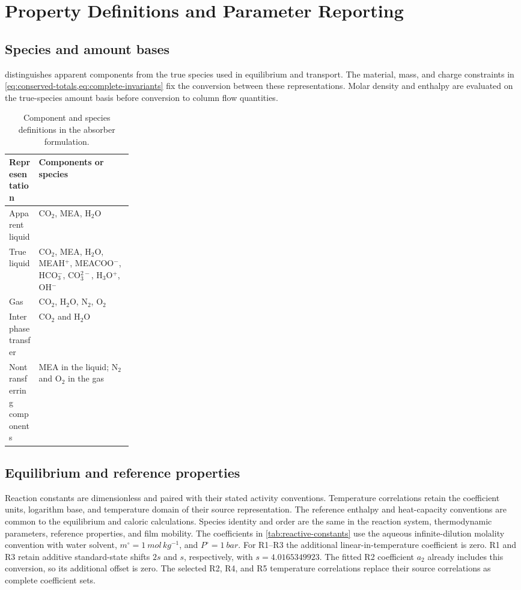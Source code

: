 \section{Property Definitions and Parameter Reporting}\label{sec:properties}
\subsection{Species and amount bases}
 distinguishes apparent components from the true species used in equilibrium and transport.
The material, mass, and charge constraints in \cref{eq:conserved-totals,eq:complete-invariants} fix the conversion between these representations.
Molar density and enthalpy are evaluated on the true-species amount basis before conversion to column flow quantities.

\begin{table}[pos=htbp]
\centering\small
\caption{Component and species definitions in the absorber formulation.}
\label{tab:species-basis}
\begin{tabularx}{\linewidth}{@{}p{0.24\linewidth}X@{}}
\toprule
Representation & Components or species\\
\midrule
Apparent liquid & CO$_2$, MEA, H$_2$O\\
True liquid & CO$_2$, MEA, H$_2$O, MEAH$^+$, MEACOO$^-$, HCO$_3^-$, CO$_3^{2-}$, H$_3$O$^+$, OH$^-$\\
Gas & CO$_2$, H$_2$O, N$_2$, O$_2$\\
Interphase transfer & CO$_2$ and H$_2$O\\
Nontransferring components & MEA in the liquid; N$_2$ and O$_2$ in the gas\\
\bottomrule
\end{tabularx}
\end{table}

\subsection{Equilibrium and reference properties}\label{sec:appendix-properties}
Reaction constants are dimensionless and paired with their stated activity conventions.
Temperature correlations retain the coefficient units, logarithm base, and temperature domain of their source representation.
The reference enthalpy and heat-capacity conventions are common to the equilibrium and caloric calculations.
Species identity and order are the same in the reaction system, thermodynamic parameters, reference properties, and film mobility.
The coefficients in \cref{tab:reactive-constants} use the aqueous infinite-dilution molality convention with water solvent, $m^\circ=\qty{1}{mol\,kg^{-1}}$, and $P^\circ=\qty{1}{bar}$.
For R1--R3 the additional linear-in-temperature coefficient is zero.
R1 and R3 retain additive standard-state shifts $2s$ and $s$, respectively, with $s=4.0165349923$.
The fitted R2 coefficient $a_2$ already includes this conversion, so its additional offset is zero.
The selected R2, R4, and R5 temperature correlations replace their source correlations as complete coefficient sets.

